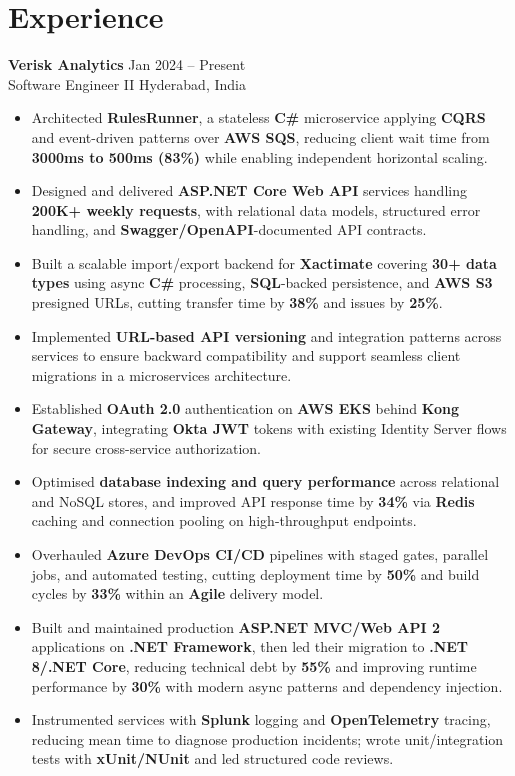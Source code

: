 \documentclass[10pt,letterpaper]{article}
\newcommand{\resumeSubheading}[4]{%
  \textbf{#1} \hfill #2 \\
  #3 \hfill #4 \\
}
\begin{document}
\section*{Experience}
\resumeSubheading{Verisk Analytics}{Jan 2024 -- Present}{Software Engineer II}{Hyderabad, India}
\begin{itemize}
    \item Architected \textbf{RulesRunner}, a stateless \textbf{C\#} microservice applying \textbf{CQRS} and event-driven patterns over \textbf{AWS SQS}, reducing client wait time from \textbf{3000ms to 500ms (83\%)} while enabling independent horizontal scaling.
    \item Designed and delivered \textbf{ASP.NET Core Web API} services handling \textbf{200K+ weekly requests}, with relational data models, structured error handling, and \textbf{Swagger/OpenAPI}-documented API contracts.
    \item Built a scalable import/export backend for \textbf{Xactimate} covering \textbf{30+ data types} using async \textbf{C\#} processing, \textbf{SQL}-backed persistence, and \textbf{AWS S3} presigned URLs, cutting transfer time by \textbf{38\%} and issues by \textbf{25\%}.
    \item Implemented \textbf{URL-based API versioning} and integration patterns across services to ensure backward compatibility and support seamless client migrations in a microservices architecture.
    \item Established \textbf{OAuth 2.0} authentication on \textbf{AWS EKS} behind \textbf{Kong Gateway}, integrating \textbf{Okta JWT} tokens with existing Identity Server flows for secure cross-service authorization.
    \item Optimised \textbf{database indexing and query performance} across relational and NoSQL stores, and improved API response time by \textbf{34\%} via \textbf{Redis} caching and connection pooling on high-throughput endpoints.
    \item Overhauled \textbf{Azure DevOps CI/CD} pipelines with staged gates, parallel jobs, and automated testing, cutting deployment time by \textbf{50\%} and build cycles by \textbf{33\%} within an \textbf{Agile} delivery model.
    \item Built and maintained production \textbf{ASP.NET MVC/Web API 2} applications on \textbf{.NET Framework}, then led their migration to \textbf{.NET 8/.NET Core}, reducing technical debt by \textbf{55\%} and improving runtime performance by \textbf{30\%} with modern async patterns and dependency injection.
    \item Instrumented services with \textbf{Splunk} logging and \textbf{OpenTelemetry} tracing, reducing mean time to diagnose production incidents; wrote unit/integration tests with \textbf{xUnit/NUnit} and led structured code reviews.
\end{itemize}
\end{document}
